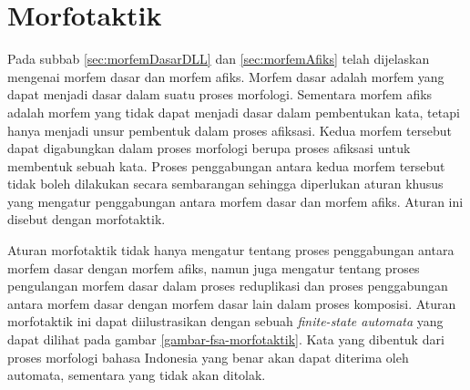 %
%




\section{Morfotaktik}
\label{sec:morfotaktik}

Pada subbab \ref{sec:morfemDasarDLL} dan \ref{sec:morfemAfiks} telah dijelaskan mengenai morfem dasar dan morfem afiks. Morfem dasar adalah morfem yang dapat menjadi dasar dalam suatu proses morfologi. Sementara morfem afiks adalah morfem yang tidak dapat menjadi dasar dalam pembentukan kata, tetapi hanya menjadi unsur pembentuk dalam proses afiksasi. Kedua morfem tersebut dapat digabungkan dalam proses morfologi berupa proses afiksasi untuk membentuk sebuah kata. Proses penggabungan antara kedua morfem tersebut tidak boleh dilakukan secara sembarangan sehingga diperlukan aturan khusus yang mengatur penggabungan antara morfem dasar dan morfem afiks. Aturan ini disebut dengan morfotaktik. 

Aturan morfotaktik tidak hanya mengatur tentang proses penggabungan antara morfem dasar dengan morfem afiks, namun juga mengatur tentang proses pengulangan morfem dasar dalam proses reduplikasi dan proses penggabungan antara morfem dasar dengan morfem dasar lain dalam proses komposisi. Aturan morfotaktik ini dapat diilustrasikan dengan sebuah \textit{finite-state automata} yang dapat dilihat pada gambar \ref{gambar-fsa-morfotaktik}. Kata yang dibentuk dari proses morfologi bahasa Indonesia yang benar akan dapat diterima oleh automata, sementara yang tidak akan ditolak.

